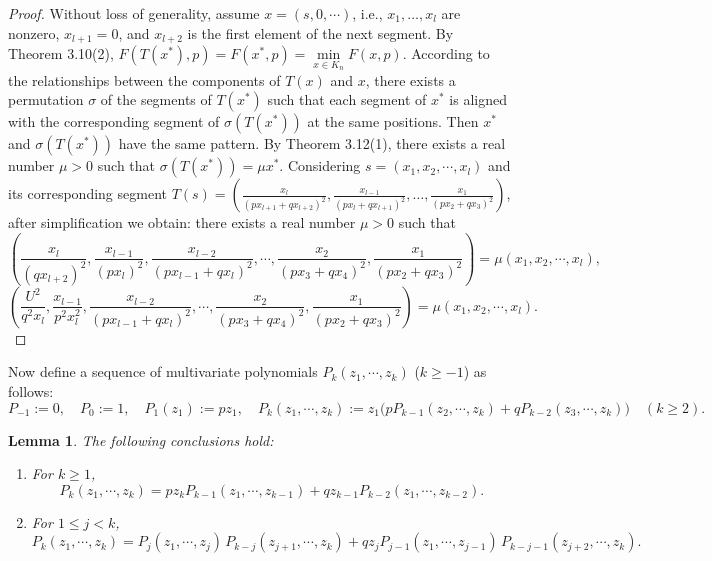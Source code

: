 \documentclass[a4paper,fleqn,numbers]{cas-sc}
\newtheorem{lemma}[theorem]{Lemma}
\begin{document}
	\begin{proof}
		Without loss of generality, assume \(x = (s, 0, \cdots)\), i.e., \(x_1, \dots, x_l\) are nonzero, \(x_{l+1} = 0\), and \(x_{l+2}\) is the first element of the next segment. By Theorem 3.10(2), \(F(T(x^*),p)=F(x^*,p)=\min\limits_{x \in K_n}F(x,p)\). According to the relationships between the components of \(T(x)\) and \(x\), there exists a permutation \(\sigma\) of the segments of \(T(x^*)\) such that each segment of \(x^*\) is aligned with the corresponding segment of \(\sigma(T(x^*))\) at the same positions. Then \(x^*\) and \(\sigma(T(x^*))\) have the same pattern. By Theorem 3.12(1), there exists a real number \(\mu>0\) such that \(\sigma (T(x^*))=\mu x^*\). Considering \(s= (x_1, x_2, \cdots, x_l)\) and its corresponding segment \(T(s)= \left(\frac{x_{l}}{(p x_{l+1} + q x_{l+2})^2},\frac{x_{l-1}}{(p x_{l} + q x_{l+1})^2},  \dots, \frac{x_{1}}{(p x_{2} + q x_{3})^2}\right)\), after simplification we obtain: there exists a real number \(\mu > 0\) such that
		\[
		\left( \frac{x_l}{(q x_{l+2})^2}, \frac{x_{l-1}}{(p x_l)^2}, \frac{x_{l-2}}{(p x_{l-1} + q x_l)^2}, \cdots, \frac{x_2}{(p x_3 + q x_4)^2}, \frac{x_1}{(p x_2 + q x_3)^2} \right) = \mu (x_1, x_2, \cdots, x_l),
		\]
		\[
		\left( \frac{U^2}{q^2 x_l}, \frac{x_{l-1}}{p^2 x_l^2}, \frac{x_{l-2}}{(p x_{l-1} + q x_l)^2}, \cdots, \frac{x_2}{(p x_3 + q x_4)^2}, \frac{x_1}{(p x_2 + q x_3)^2} \right) = \mu (x_1, x_2, \cdots, x_l).
		\]
	\end{proof}
	
	Now define a sequence of multivariate polynomials \( P_k(z_1,\cdots,z_k) \) (\( k\geq -1 \)) as follows:
	\[
	P_{-1}:=0,\quad P_0 := 1,\quad P_1(z_1) := p z_1,\quad P_k(z_1,\cdots,z_k) := z_1\bigl(p P_{k-1}(z_2,\cdots,z_k) + q P_{k-2}(z_3,\cdots,z_k)\bigr)\quad(k\ge2).
	\]
	
	\begin{lemma}
		The following conclusions hold:
		\begin{enumerate}
			\item For \( k\ge1 \),
			\[
			P_k(z_1,\cdots,z_k) = p z_k P_{k-1}(z_1,\cdots,z_{k-1}) + q z_{k-1} P_{k-2}(z_1,\cdots,z_{k-2}).
			\]
			\item For \( 1\le j<k \),
			\[
			P_k(z_1,\cdots,z_k) = P_j(z_1,\cdots,z_j)\,P_{k-j}(z_{j+1},\cdots,z_k)
			+ q z_j P_{j-1}(z_1,\cdots,z_{j-1})\,P_{k-j-1}(z_{j+2},\cdots,z_k).
			\]
		\end{enumerate}
	\end{lemma}
	
\end{document}
